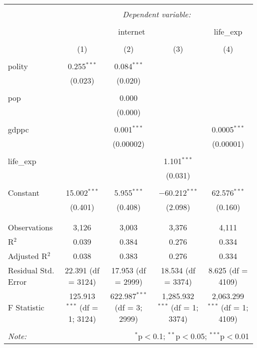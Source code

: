 
\begin{tabular}{@{\extracolsep{5pt}}lcccc} 
\\[-1.8ex]\hline 
\hline \\[-1.8ex] 
 & \multicolumn{4}{c}{\textit{Dependent variable:}} \\ 
\cline{2-5} 
\\[-1.8ex] & \multicolumn{3}{c}{internet} & life\_exp \\ 
\\[-1.8ex] & (1) & (2) & (3) & (4)\\ 
\hline \\[-1.8ex] 
 polity & 0.255$^{***}$ & 0.084$^{***}$ &  &  \\ 
  & (0.023) & (0.020) &  &  \\ 
  & & & & \\ 
 pop &  & 0.000 &  &  \\ 
  &  & (0.000) &  &  \\ 
  & & & & \\ 
 gdppc &  & 0.001$^{***}$ &  & 0.0005$^{***}$ \\ 
  &  & (0.00002) &  & (0.00001) \\ 
  & & & & \\ 
 life\_exp &  &  & 1.101$^{***}$ &  \\ 
  &  &  & (0.031) &  \\ 
  & & & & \\ 
 Constant & 15.002$^{***}$ & 5.955$^{***}$ & $-$60.212$^{***}$ & 62.576$^{***}$ \\ 
  & (0.401) & (0.408) & (2.098) & (0.160) \\ 
  & & & & \\ 
\hline \\[-1.8ex] 
Observations & 3,126 & 3,003 & 3,376 & 4,111 \\ 
R$^{2}$ & 0.039 & 0.384 & 0.276 & 0.334 \\ 
Adjusted R$^{2}$ & 0.038 & 0.383 & 0.276 & 0.334 \\ 
Residual Std. Error & 22.391 (df = 3124) & 17.953 (df = 2999) & 18.534 (df = 3374) & 8.625 (df = 4109) \\ 
F Statistic & 125.913$^{***}$ (df = 1; 3124) & 622.987$^{***}$ (df = 3; 2999) & 1,285.932$^{***}$ (df = 1; 3374) & 2,063.299$^{***}$ (df = 1; 4109) \\ 
\hline 
\hline \\[-1.8ex] 
\textit{Note:}  & \multicolumn{4}{r}{$^{*}$p$<$0.1; $^{**}$p$<$0.05; $^{***}$p$<$0.01} \\ 
\end{tabular} 

